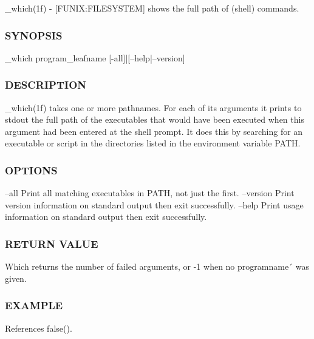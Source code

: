 \+\_\+which(1f) -\/ \mbox{[}F\+U\+N\+IX\+:F\+I\+L\+E\+S\+Y\+S\+T\+EM\mbox{]} shows the full path of (shell) commands. 

\subsubsection*{S\+Y\+N\+O\+P\+S\+IS}

\begin{DoxyVerb}    _which program_leafname [-all]|[--help|--version]
\end{DoxyVerb}


\subsubsection*{D\+E\+S\+C\+R\+I\+P\+T\+I\+ON}

\+\_\+which(1f) takes one or more pathnames. For each of its arguments it prints to stdout the full path of the executables that would have been executed when this argument had been entered at the shell prompt. It does this by searching for an executable or script in the directories listed in the environment variable P\+A\+TH.

\subsubsection*{O\+P\+T\+I\+O\+NS}

--all Print all matching executables in P\+A\+TH, not just the first. --version Print version information on standard output then exit successfully. --help Print usage information on standard output then exit successfully.

\subsubsection*{R\+E\+T\+U\+RN V\+A\+L\+UE}

Which returns the number of failed arguments, or -\/1 when no programname´ was given.

\subsubsection*{E\+X\+A\+M\+P\+LE}

References false().


